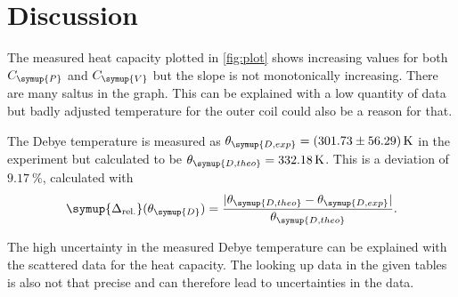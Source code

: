 \section{Discussion}
\label{sec:Diskussion}
The measured heat capacity plotted in \autoref{fig:plot} shows increasing values for both $C_{\symup{P}}$ and $C_{\symup{V}}$ but the slope is 
not monotonically increasing. There are many saltus in the graph. This can be explained with a low quantity of data but badly adjusted temperature for
the outer coil could also be a reason for that.

The Debye temperature is measured as $\theta_{\symup{D, exp}} = \qty{301.73 +- 56.29}{\kelvin}$ in the experiment but calculated to 
be $\theta_{\symup{D, theo}} = \qty{332.18}{\kelvin}$. This is a deviation of $\qty{9.17}{\percent}$, calculated with
\begin{equation*}
    \symup{\Delta_\text{rel.}}(\theta_{\symup{D}}) = \frac{|\theta_{\symup{D, theo}} - \theta_{\symup{D, exp}}|}{\theta_{\symup{D, theo}}}.
\end{equation*}

The high uncertainty in the measured Debye temperature can be explained with the scattered data for the heat capacity. The looking up data in the given tables
is also not that precise and can therefore lead to uncertainties in the data.